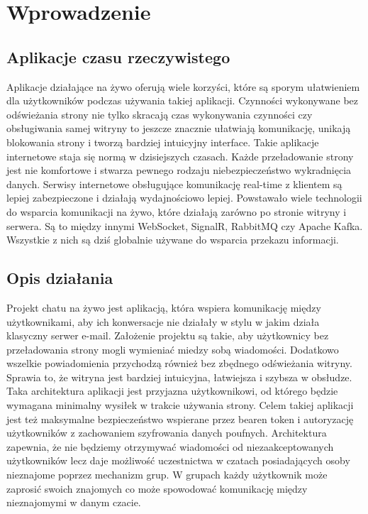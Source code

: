 \documentclass[12pt,a4paper]{article}
\begin{document}
\section{Wprowadzenie} 

\subsection{Aplikacje czasu rzeczywistego}
\hspace*{0.7cm} Aplikacje działające na żywo oferują wiele korzyści, które są sporym ułatwieniem dla użytkowników podczas używania takiej aplikacji. Czynności wykonywane
bez odświeżania strony nie tylko skracają czas wykonywania czynności czy obsługiwania samej witryny to jeszcze znacznie ułatwiają komunikację, unikają 
blokowania strony i tworzą bardziej intuicyjny interface. Takie aplikacje internetowe staja się normą w dzisiejszych czasach. Każde przeładowanie strony jest
nie komfortowe i stwarza pewnego rodzaju niebezpieczeństwo wykradnięcia danych. Serwisy internetowe obsługujące komunikację real-time z klientem są lepiej 
zabezpieczone i działają wydajnościowo lepiej. Powstawało wiele technologii do wsparcia komunikacji na żywo, które działają zarówno po stronie witryny i
serwera. Są to między innymi WebSocket, SignalR, RabbitMQ czy Apache Kafka. Wszystkie z nich są dziś globalnie używane do wsparcia przekazu informacji.

\subsection{Opis działania}
\hspace*{0.7cm} Projekt chatu na żywo jest aplikacją, która wspiera komunikację między użytkownikami, aby ich konwersacje nie działały w stylu w jakim działa klasyczny serwer
e-mail. Założenie projektu są takie, aby użytkownicy bez przeładowania strony mogli wymieniać miedzy sobą wiadomości. Dodatkowo wszelkie powiadomienia
przychodzą również bez zbędnego odświeżania witryny. Sprawia to, że witryna jest bardziej intuicyjna, łatwiejsza i szybsza w obsłudze. Taka architektura
aplikacji jest przyjazna użytkownikowi, od którego będzie wymagana minimalny wysiłek w trakcie używania strony. Celem takiej aplikacji jest też maksymalne 
bezpieczeństwo wspierane przez bearen token i autoryzację użytkowników z zachowaniem szyfrowania danych poufnych. Architektura zapewnia, że nie będziemy otrzymywać wiadomości od niezaakceptowanych użytkowników lecz daje możliwość uczestnictwa w czatach posiadających osoby nieznajome poprzez mechanizm grup. W grupach każdy użytkownik może zaprosić swoich znajomych co może spowodować komunikację między nieznajomymi w danym czacie.
\end{document}
